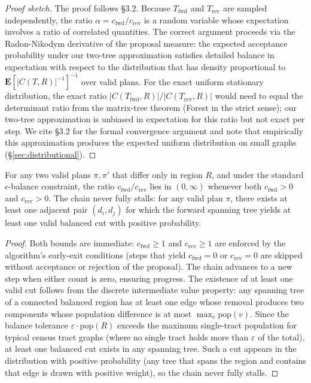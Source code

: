 \begin{proof}[Proof sketch]
The proof follows \citet{mccartan2020} \S3.2.
Because $T_{\mathrm{fwd}}$ and $T_{\mathrm{rev}}$ are sampled independently,
the ratio $\alpha = c_{\mathrm{fwd}} / c_{\mathrm{rev}}$ is a random variable
whose expectation involves a ratio of correlated quantities.
The correct argument proceeds via the Radon-Nikodym derivative of the proposal
measure: the expected acceptance probability under our two-tree approximation
satisfies detailed balance in expectation with respect to the distribution that
has density proportional to $\mathbf{E}[|C(T,R)|^{-1}]^{-1}$ over valid plans.
For the exact uniform stationary distribution, the exact ratio
$|C(T_{\mathrm{fwd}}, R)| / |C(T_{\mathrm{rev}}, R)|$ would need to equal
the determinant ratio from the matrix-tree theorem (Forest \recom{} in the
strict sense); our two-tree approximation is unbiased in expectation for this
ratio but not exact per step.
We cite \citet{mccartan2020} \S3.2 for the formal convergence argument and
note that empirically this approximation produces the expected uniform
distribution on small graphs (\S\ref{sec:distributional}).
\end{proof}

\begin{proposition}
\label{prop:ratio-bounded}
For any two valid plans $\pi, \pi'$ that differ only in region $R$, and
under the standard $\epsilon$-balance constraint, the ratio
$c_{\mathrm{fwd}} / c_{\mathrm{rev}}$ lies in $(0, \infty)$ whenever both
$c_{\mathrm{fwd}} > 0$ and $c_{\mathrm{rev}} > 0$.
The chain never fully stalls: for any valid plan $\pi$, there exists at
least one adjacent pair $(d_i, d_j)$ for which the forward spanning tree
yields at least one valid balanced cut with positive probability.
\end{proposition}

\begin{proof}
Both bounds are immediate: $c_{\mathrm{fwd}} \geq 1$ and $c_{\mathrm{rev}} \geq 1$
are enforced by the algorithm's early-exit conditions (steps that yield
$c_{\mathrm{fwd}} = 0$ or $c_{\mathrm{rev}} = 0$ are skipped without
acceptance or rejection of the proposal).
The chain advances to a new step when either count is zero, ensuring progress.
The existence of at least one valid cut follows from the discrete intermediate
value property: any spanning tree of a connected balanced region has at least
one edge whose removal produces two components whose population difference is
at most $\max_v \mathrm{pop}(v)$.
Since the balance tolerance $\varepsilon \cdot \mathrm{pop}(R)$ exceeds the
maximum single-tract population for typical census tract graphs (where no
single tract holds more than $\varepsilon$ of the total), at least one
balanced cut exists in any spanning tree.
Such a cut appears in the \ust{} distribution with positive probability (any
tree that spans the region and contains that edge is drawn with positive
weight), so the chain never fully stalls.
\end{proof}

